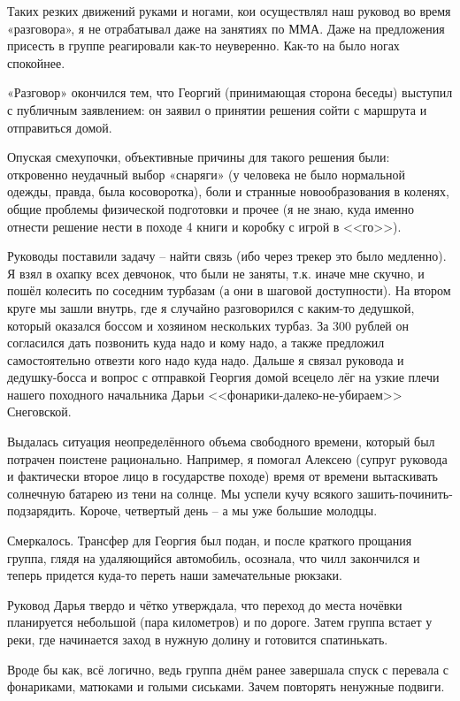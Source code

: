 Таких резких движений руками и ногами, кои осуществлял наш руковод во время «разговора», я не отрабатывал даже на занятиях по ММА. Даже на предложения присесть в группе реагировали как-то неуверенно. Как-то на было ногах спокойнее.

«Разговор» окончился тем, что Георгий (принимающая сторона беседы) выступил с публичным заявлением: он заявил о принятии решения сойти с маршрута и отправиться домой.

Опуская смехупочки, объективные причины для такого решения были: откровенно неудачный выбор «снаряги» (у человека не было нормальной одежды, правда, была косоворотка), боли и странные новообразования в коленях, общие проблемы физической подготовки и прочее (я не знаю, куда именно отнести решение нести в походе 4 книги и коробку с игрой в <<го>>).

Руководы поставили задачу – найти связь (ибо через трекер это было медленно). Я взял в охапку всех девчонок, что были не заняты, т.к. иначе мне скучно, и пошёл колесить по соседним турбазам (а они в шаговой доступности). На втором круге мы зашли внутрь, где я случайно разговорился с каким-то дедушкой, который оказался боссом и хозяином нескольких турбаз. За 300 рублей он согласился дать позвонить куда надо и кому надо, а также предложил самостоятельно отвезти кого надо куда надо. Дальше я связал руковода и дедушку-босса и вопрос с отправкой Георгия домой всецело лёг на узкие плечи нашего походного начальника Дарьи <<фонарики-далеко-не-убираем>> Снеговской.

Выдалась ситуация неопределённого объема свободного времени, который был потрачен поистене рационально. Например, я помогал Алексею (супруг руковода и фактически второе лицо в государстве походе) время от времени вытаскивать солнечную батарею из тени на солнце. Мы успели кучу всякого зашить-починить-подзарядить. Короче, четвертый день – а мы уже большие молодцы.

Смеркалось. Трансфер для Георгия был подан, и после краткого прощания группа, глядя на удаляющийся автомобиль, осознала, что чилл закончился и теперь придется куда-то переть наши замечательные рюкзаки.

Руковод Дарья твердо и чётко утверждала, что переход до места ночёвки планируется небольшой (пара километров) и по дороге. Затем группа встает у реки, где начинается заход в нужную долину и готовится спатинькать.

Вроде бы как, всё логично, ведь группа днём ранее завершала спуск с перевала с фонариками, матюками и голыми сиськами. Зачем повторять ненужные подвиги. 

